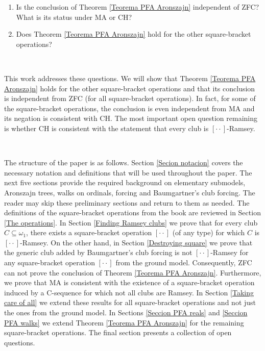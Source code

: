 \documentclass{article}
\begin{document}
\begin{enumerate}
\item Is the conclusion of Theorem \ref{Teorema PFA Aronszajn} independent of
\textsf{ZFC? }What is its status under \textsf{MA }or \textsf{CH}?

\item Does Theorem \ref{Teorema PFA Aronszajn} hold for the other
square-bracket operations?
\end{enumerate}

\qquad\ \ 

This work addresses these questions. We will show that Theorem
\ref{Teorema PFA Aronszajn} holds for the other square-bracket operations and
that its conclusion is independent from \textsf{ZFC }(for all square-bracket
operations).\textsf{ }In fact, for some of the square-bracket operations, the
conclusion is even independent from \textsf{MA }and its negation is consistent
with \textsf{CH}. The most important open question remaining is whether
\textsf{CH }is consistent with the statement that every club is $[\cdot\cdot]$-Ramsey.

\qquad\qquad\ \ \ 

The structure of the paper is as follows. Section \ref{Secion notacion} covers
the necessary notation and definitions that will be used throughout the paper.
The next five sections provide the required background on elementary
submodels, Aronszajn trees, walks on ordinals, forcing and Baumgartner's club
forcing. The reader may skip these preliminary sections and return to them as
needed. The definitions of the square-bracket operations from the book
\cite{Walks} are reviewed in Section \ref{The operations}. In Section
\ref{Finding Ramsey clubs} we prove that for every club $C\subseteq\omega_{1}%
$, there exists a square-bracket operation $[\cdot\cdot]$ (of any type) for
which $C$ is $[\cdot\cdot]$-Ramsey. On the other hand, in Section
\ref{Destroying square} we prove that the generic club added by Baumgartner's
club forcing is not $[\cdot\cdot]$-Ramsey for any square-bracket operation
$[\cdot\cdot]$ from the ground model. Consequently, \textsf{ZFC }can not prove
the conclusion of Theorem \ref{Teorema PFA Aronszajn}. Furthermore, we prove
that \textsf{MA }is consistent with the existence of a square-bracket
operation induced by a \textsf{C}-sequence for which not all clubs are Ramsey.
In Section \ref{Taking care of all} we extend these results for all
square-bracket operations and not just the ones from the ground model. In
Sections \ref{Seccion PFA reals} and \ref{Seccion PFA walks} we extend Theorem
\ref{Teorema PFA Aronszajn} for the remaining square-bracket operations. The
final section presents a collection of open questions.
\end{document}
